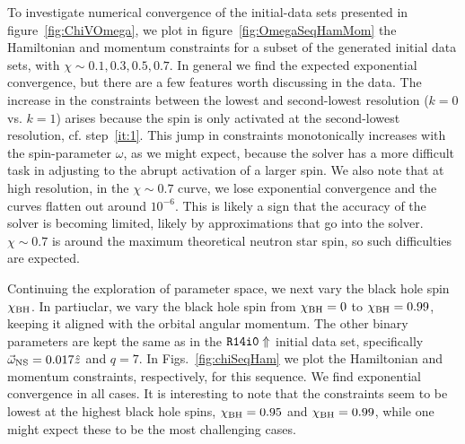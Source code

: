 To investigate numerical convergence of the initial-data sets
presented in figure~\ref{fig:ChiVOmega}, we plot in
figure~\ref{fig:OmegaSeqHamMom} the Hamiltonian and momentum
constraints for a subset of the generated initial data sets, with
$\chi\sim{0.1,0.3,0.5,0.7}$. In general we find the expected
exponential convergence, but there are a few features worth discussing
in the data. The increase in the constraints between the lowest and
second-lowest resolution ($k=0$ vs. $k=1$) arises because the spin is
only activated at the second-lowest resolution, cf. step~\ref{it:1}.
This jump in constraints  monotonically increases with the spin-parameter $\omega$, as we might expect, because the solver has a more difficult task
in adjusting to the abrupt activation of a larger spin. We also note that
at high resolution, in the $\chi\sim 0.7$ curve, we lose exponential
convergence and the curves flatten out around $10^{-6}$. 
This is likely a sign that
the accuracy of the solver is becoming limited, likely by
approximations that go into the solver. $\chi\sim 0.7$ is around the
maximum theoretical neutron star spin, so such difficulties are
expected.


Continuing the exploration of parameter space, we next vary the black
hole spin $\chi_{\rm BH}$. In partiuclar, we vary the black hole spin
from $\chi_{\rm BH}=0$ to $\chi_{\rm BH}=0.99$, keeping it aligned
with the orbital angular momentum. The other binary parameters are
kept the same as in the ${\tt R14i0\Uparrow}$ initial data set,
specifically $\vec{\omega}_{\rm NS}=0.017\hat z$ and $q=7$. In
Figs.~\ref{fig:chiSeqHam} we plot the Hamiltonian and momentum
constraints, respectively, for this sequence. We find exponential
convergence in all cases. It is interesting to note that the
constraints seem to be lowest at the highest black hole spins,
$\chi_{\rm BH}=0.95$ and $\chi_{\rm BH}=0.99$, while one might expect
these to be the most challenging cases.

